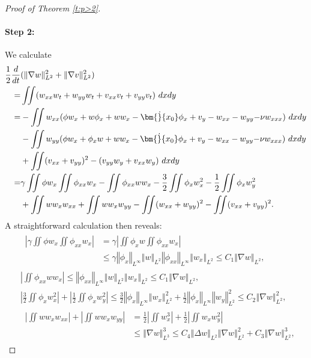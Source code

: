 \documentclass[final,11pt]{article}
\renewcommand{\leq}{\leqslant}
\theoremstyle{definition} %
\newcommand{\lv}{\left\Vert}
\newcommand{\rv}{\right\Vert}
\newcommand{\half}{\frac{1}{2}}
\theoremstyle{plain}
\theoremstyle{definition} %
\theoremstyle{remark}
\begin{document}
\begin{proof}[Proof of Theorem \ref{t:p>2}]
\paragraph{Step 2:} We calculate 
\begin{align*} 
\half \frac{d}{dt}&(\|\nabla w\|_{L^2}^2+\|\nabla v\|_{L^2}^2) \\ 
= &\iint (w_{xx}w_t + w_{yy}w_t + v_{xx}v_t + v_{yy}v_t)~dxdy\\
= &-\iint w_{xx}(\phi w_x + w\phi_x + ww_x -\bm{\dot}{x_0} \phi_x + v_y - w_{xx} - w_{yy} {-\nu w_{xxx}})~dxdy \\
& - \iint w_{yy}(\phi w_x + \phi_xw + ww_x -\bm{\dot}{x_0} \phi_x + v_y - w_{xx} - w_{yy} {-\nu w_{xxx}})~dxdy \\
& + \iint (v_{xx} + v_{yy})^2-(v_{yy} w_y + v_{xx}w_y)~dxdy \\
   =& \gamma \iint \phi w_x  \iint \phi_{xx} w_x  -\iint \phi_{xx}ww_x - \frac{3}{2}\iint \phi_x w_x^2  - \frac12 \iint \phi_x w_y^2 \\
&+ \iint ww_xw_{xx} + \iint ww_xw_{yy}- \iint (w_{xx} + w_{yy})^2- \iint (v_{xx} + v_{yy})^2. 
\end{align*}
A straightforward calculation then reveals:
\begin{align*}
&\,\begin{aligned}\left|\gamma \iint \phi w_x  \iint \phi_{xx} w_x \right| &= \gamma \left| \iint \phi_x w  \iint \phi_{xx} w_x \right| \\ 
&\leq \gamma \lv \phi_x \rv_{L^\infty} \lv w \rv_{L^2} \lv \phi_{xx} \rv_{L^\infty} \lv w_x \rv_{L^2} \leq C_1\lv \nabla w \rv_{L^2}, \end{aligned}\\
&\left|\iint \phi_{xx}ww_x\right| \leq   \lv \phi_{xx} \rv_{L^\infty} \lv w \rv_{L^2}\lv w_x \rv_{L^2} \leq C_1\lv \nabla w \rv_{L^2}, \\
&\left|\frac{3}{2}\iint \phi_x w_x^2\right| + \left|\frac12 \iint \phi_x w_y^2\right| \leq \frac{3}{2}\lv \phi_x \rv_{L^\infty} \lv w_x \rv_{L^2}^2 + \frac12 \lv \phi_x \rv_{L^\infty} \lv w_y \rv_{L^2}^2\leq C_2 \lv \nabla w \rv_{L^2}^2, \\
&\,\begin{aligned}\left|\iint ww_xw_{xx}\right| +  \left|\iint ww_xw_{yy}\right|  &= \frac12  \left|\iint w_x^3\right| + \frac12  \left| \iint w_xw_y^2\right| \\
&\leq \lv \nabla w \rv_{L^3}^3 \leq C_4\lv \Delta w\rv_{L^2} \lv \nabla w \rv_{L^2}^2 + C_3\lv \nabla w \rv_{L^2}^3,\end{aligned}

\end{align*}
\end{proof}
\end{document}
